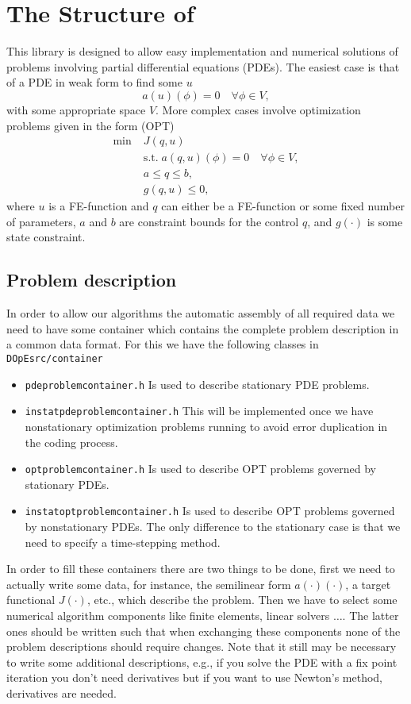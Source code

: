 \chapter{The Structure of \dope{}}
This library is designed to allow easy implementation and numerical solutions 
of problems involving partial differential equations (PDEs). The easiest case 
is that of a PDE in weak form to find some $u$
\[
a(u)(\phi) = 0 \quad \forall \phi \in V,
\]
with some appropriate space $V$.
More complex cases involve optimization problems given in the form (OPT)
\begin{align*}
\min\;&J(q,u) \\
  &\text{s.t.}\; a(q,u)(\phi) = 0 \quad \forall \phi\in V,\\
  &a \le q \le b,\\
  &g(q,u) \le 0,  
\end{align*}
where $u$ is a FE-function and $q$ can either be a FE-function or some 
fixed number of parameters, $a$ and $b$ are constraint bounds for the control $q$,
and $g(\cdot)$ is some state constraint.


\section{Problem description}
In order to allow our algorithms the automatic assembly of all required 
data we need to have some container which contains the complete problem 
description in a common data format. For this we have the following 
classes in \texttt{DOpEsrc/container}
\begin{itemize}
  \item \texttt{pdeproblemcontainer.h} Is used to describe  stationary PDE problems.
  \item \texttt{instatpdeproblemcontainer.h} 
This will be implemented once we have nonstationary optimization problems running to avoid error duplication in the coding process.
  \item \texttt{optproblemcontainer.h} Is used to describe  OPT problems governed by 
    stationary PDEs. 
  \item \texttt{instatoptproblemcontainer.h} Is used to describe  OPT problems governed by nonstationary PDEs. The only difference to the stationary case is that we need to specify a time-stepping method.  
\end{itemize}
In order to fill these containers there are two things to be done,
first we need to actually write some data, for instance,
the semilinear form $a(\cdot)(\cdot)$, a target functional $J(\cdot)$, etc.,
which describe the problem. Then we have to select some numerical 
algorithm components like finite elements, linear solvers $\ldots$.
The latter ones should be written such that when exchanging these components
none of the problem descriptions should require changes. 
Note that it still may be necessary to write some additional descriptions, 
e.g., if you solve the PDE with a fix point iteration you don't need derivatives
but if you want to use Newton's method, derivatives are needed.

